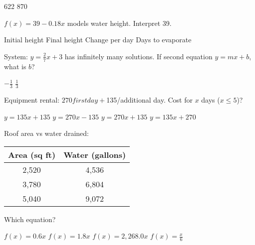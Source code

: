 \documentclass[12pt]{exam}
\begin{document}
\begin{questions}
\begin{choices}
622
870
\end{choices}

\begin{center}
\end{center}

\question $f(x) = 39 - 0.18x$ models water height. Interpret 39.
\begin{choices}
\choice Initial height
\choice Final height
\choice Change per day
\choice Days to evaporate
\end{choices}

\question System: $y = \frac{2}{7}x + 3$ has infinitely many solutions. If second equation $y = mx + b$, what is $b$?
\begin{choices}
\choice $-\frac{1}{3}$
\choice $\frac{1}{3}$
\end{choices}

\question Equipment rental: $270 first day + $135/additional day. Cost for $x$ days ($x \leq 5$)?
\begin{choices}
\choice $y = 135x + 135$
\choice $y = 270x - 135$
\choice $y = 270x + 135$
\choice $y = 135x + 270$
\end{choices}

\question Roof area vs water drained:
\begin{center}
\begin{tabular}{|c|c|}
\hline
Area (sq ft) & Water (gallons) \\
\hline
2,520 & 4,536 \\
3,780 & 6,804 \\
5,040 & 9,072 \\
\hline
\end{tabular}
\end{center}
Which equation?
\begin{choices}
\choice $f(x) = 0.6x$
\choice $f(x) = 1.8x$
\choice $f(x) = 2,268.0x$
\choice $f(x) = \frac{x}{6}$
\end{choices}


\end{questions}
\end{document}
